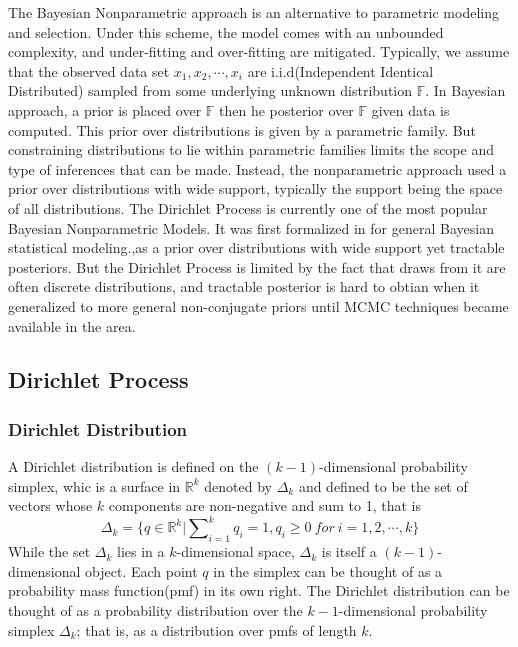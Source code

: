 \documentclass[a4paper,14pt]{article}
\begin{document}
The Bayesian Nonparametric approach is an alternative to parametric modeling and selection. Under this scheme, the model comes with an unbounded complexity, and under-fitting and over-fitting are mitigated\cite{gershman2012tutorial}. Typically, we assume that the observed data set $x_1,x_2,\cdots,x_i$ are i.i.d(Independent Identical Distributed) sampled from some underlying unknown distribution $\mathbb{F}$. In Bayesian approach,  a prior is placed over $\mathbb{F}$ then he posterior over  $\mathbb{F}$ given data is computed. This prior over distributions is given by a parametric family. But constraining distributions to lie within parametric families limits the scope and type of inferences that can be made. Instead, the nonparametric approach used a prior over distributions with wide support, typically the support being the space of all distributions.  The Dirichlet Process is currently one of the most popular Bayesian Nonparametric Models. It was first formalized in \cite{Ferguson1973} for general Bayesian statistical modeling.,as a prior over distributions with wide support yet tractable posteriors. But the Dirichlet Process is limited by the fact that draws from it are often discrete distributions, and tractable posterior is hard to obtian when it generalized to more general non-conjugate priors until MCMC techniques became available in the area. 
\subsection{Dirichlet Process}
\subsubsection{Dirichlet Distribution}
A Dirichlet distribution is defined on the $\mathit{(k-1)}$-dimensional probability simplex, whic is a surface in $\mathbb{R}^k$ denoted by $\Delta_k
$ and defined to be the set of vectors whose $k$ components are non-negative and sum to 1, that is
\begin{equation}
\Delta_k=\{q\in \mathbb{R}^k|\sum\nolimits_{i=1}^{k}q_i=1,q_i\geq 0\ for\ i=1,2,\cdots,k\}
\end{equation}
While the set $\Delta_k$ lies in a $k$-dimensional space, $\Delta_k$ is itself a $(k-1)$-dimensional object. Each point $q$ in the simplex can be thought of as a probability mass function(pmf) in its own right. The Dirichlet distribution can be thought of as a probability distribution over the $k-1$-dimensional probability simplex $\Delta_k$; that is, as a distribution over pmfs of length $k$.
\end{document}
